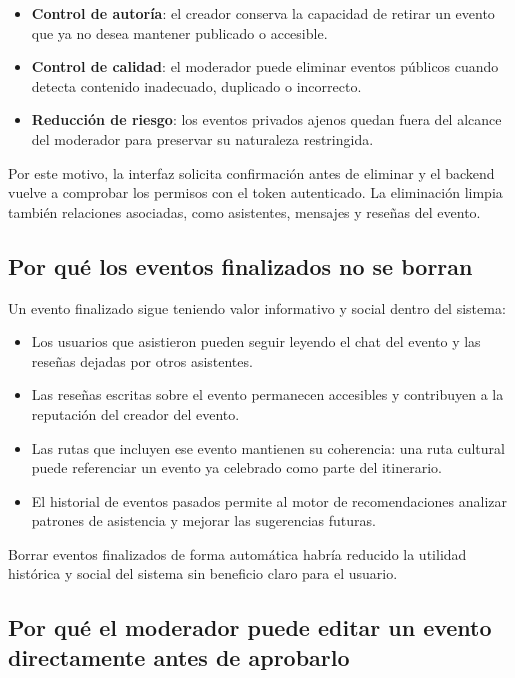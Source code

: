 \begin{itemize}
    \item \textbf{Control de autoría}: el creador conserva la capacidad de retirar un evento que ya no desea mantener publicado o accesible.
    \item \textbf{Control de calidad}: el moderador puede eliminar eventos públicos cuando detecta contenido inadecuado, duplicado o incorrecto.
    \item \textbf{Reducción de riesgo}: los eventos privados ajenos quedan fuera del alcance del moderador para preservar su naturaleza restringida.
\end{itemize}

Por este motivo, la interfaz solicita confirmación antes de eliminar y el backend vuelve a comprobar los permisos con el token autenticado. La eliminación limpia también relaciones asociadas, como asistentes, mensajes y reseñas del evento.

\subsection{Por qué los eventos finalizados no se borran}

Un evento finalizado sigue teniendo valor informativo y social dentro del sistema:

\begin{itemize}
    \item Los usuarios que asistieron pueden seguir leyendo el chat del evento y las reseñas dejadas por otros asistentes.
    \item Las reseñas escritas sobre el evento permanecen accesibles y contribuyen a la reputación del creador del evento.
    \item Las rutas que incluyen ese evento mantienen su coherencia: una ruta cultural puede referenciar un evento ya celebrado como parte del itinerario.
    \item El historial de eventos pasados permite al motor de recomendaciones analizar patrones de asistencia y mejorar las sugerencias futuras.
\end{itemize}

Borrar eventos finalizados de forma automática habría reducido la utilidad histórica y social del sistema sin beneficio claro para el usuario.

\subsection{Por qué el moderador puede editar un evento directamente antes de aprobarlo}

